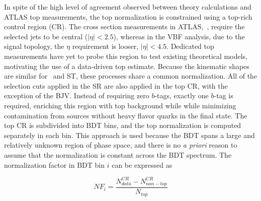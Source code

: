 In spite of the high level of agreement observed between theory
calculations and ATLAS top measurements, the top normalization is
constrained using a top-rich control region (CR). The cross section
measurements in
ATLAS,~\cite{bib:ttbar_cross_section,bib:Wt_cross_section}, require
the selected jets to be central ($|\eta|<2.5$), whereas in the VBF
analysis, due to the signal topology, the $\eta$ requirement is looser,
$|\eta|<4.5$. Dedicated top measurements have yet to probe this region
to test existing theoretical models, motivating the use of a
data-driven top estimate. Because the kinematic
shapes are similar for \ttbar~and ST, these processes share a common
normalization. All of the selection cuts applied in the SR are also
applied in the top CR, with the exception of the BJV. Instead of
requiring zero $b$-tags, exactly one $b$-tag is required, enriching
this region with top background while while minimizing contamination from
sources without heavy flavor quarks in the final state. The top CR is
subdivided into BDT bins, and the top
normalization is computed separately in each bin. This approach is
used because the BDT spans a large and relatively unknown region of
phase space, and there is no \textit{a priori} reason to assume that the
normalization is constant across the BDT spectrum. The normalization
factor in BDT bin $i$ can be expressed as

\begin{equation}
\label{chap:analysis:equation:top_nf}
NF_i = \frac{N_{data}^{CR} - N_{non-top}^{CR}}{N_{top}}
\end{equation}


